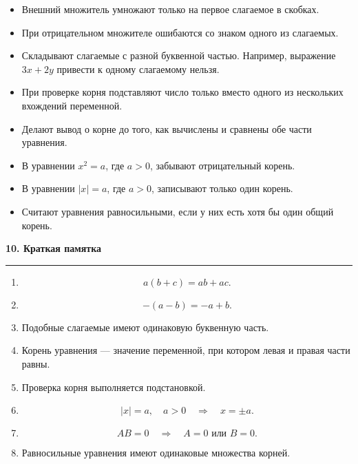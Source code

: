 \documentclass[a4paper,12pt]{article}
\newcommand{\sectiontitle}[1]{%
    \vspace{0.35em}%
    {\Large\bfseries\color{darkaccent}#1\par}%
    \vspace{0.2em}%
    {\color{accent}\rule{\linewidth}{0.7pt}}%
    \vspace{0.6em}%
}
\begin{document}
\begin{itemize}
    \item Внешний множитель умножают только на первое слагаемое в скобках.

    \item При отрицательном множителе ошибаются со знаком одного из слагаемых.

    \item Складывают слагаемые с разной буквенной частью. Например,
    выражение \(3x+2y\) привести к одному слагаемому нельзя.

    \item При проверке корня подставляют число только вместо одного из нескольких
    вхождений переменной.

    \item Делают вывод о корне до того, как вычислены и сравнены обе части уравнения.

    \item В уравнении \(x^2=a\), где \(a>0\), забывают отрицательный корень.

    \item В уравнении \(|x|=a\), где \(a>0\), записывают только один корень.

    \item Считают уравнения равносильными, если у них есть хотя бы один общий корень.
\end{itemize}

\sectiontitle{10. Краткая памятка}

\begin{enumerate}
    \item
    \[
    a(b+c)=ab+ac.
    \]

    \item
    \[
    -(a-b)=-a+b.
    \]

    \item Подобные слагаемые имеют одинаковую буквенную часть.

    \item Корень уравнения --- значение переменной, при котором левая и правая
    части равны.

    \item Проверка корня выполняется подстановкой.

    \item
    \[
    |x|=a,\quad a>0
    \quad\Longrightarrow\quad
    x=\pm a.
    \]

    \item
    \[
    AB=0
    \quad\Longrightarrow\quad
    A=0 \text{ или } B=0.
    \]

    \item Равносильные уравнения имеют одинаковые множества корней.
\end{enumerate}
\end{document}
